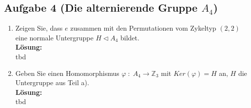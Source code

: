 \documentclass[11pt,a4paper,ngerman]{article}
\begin{document}

\subsection*{Aufgabe 4 \mdseries (Die alternierende Gruppe $A_4$)}

\begin{enumerate}[\bfseries a)]
\item Zeigen Sie, dass $e$ zusammen mit den Permutationen vom Zykeltyp $(2,2)$ eine normale Untergruppe $H \vartriangleleft A_4$ bildet.\\

\textbf{Lösung:}\\

tbd


\item Geben Sie einen Homomorphismus $\varphi \; : \; A_4 \rightarrow \mathbb{Z}_3$ mit $Ker(\varphi ) = H$ an, $H$ die Untergruppe aus Teil a).\\

\textbf{Lösung:}\\

tbd

\end{enumerate}

\label{LastPage}
\end{document}
